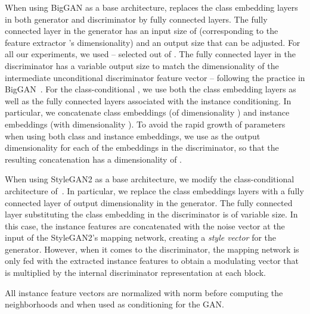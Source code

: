 When using BigGAN as a base architecture, \ours replaces the class embedding layers in both generator and discriminator by fully connected layers. The fully connected layer in the generator has an input size of  (corresponding to the feature extractor 's dimensionality) and an output size  that can be adjusted. For all our experiments, we used  -- selected out of . The fully connected layer in the discriminator has a variable output size  to match the dimensionality of the intermediate unconditional discriminator feature vector -- following the practice in BigGAN~\cite{brock2018large}. 
For the class-conditional \ours, we use both the class embedding layers as well as the fully connected layers associated with the instance conditioning. In particular, we concatenate class embeddings (of dimensionality ) and instance embeddings (with dimensionality ). To avoid the rapid growth of parameters when using both class and instance embeddings, we use  as the output dimensionality for each of the embeddings in the discriminator, so that the resulting concatenation has a dimensionality of .

When using StyleGAN2 as a base architecture, we modify the class-conditional architecture of~\cite{karras2020training}. In particular, we replace the class embeddings layers with a fully connected layer of output dimensionality  in the generator. The fully connected layer substituting the class embedding in the discriminator is of variable size. In this case, the instance features are concatenated with the noise vector at the input of the StyleGAN2's mapping network, creating a \emph{style vector} for the generator. However, when it comes to the discriminator, the mapping network is only fed with the extracted instance features to obtain a modulating vector that is multiplied by the internal discriminator representation at each block.

All instance feature vectors  are normalized with  norm before computing the neighborhoods and when used as conditioning for the GAN. 


